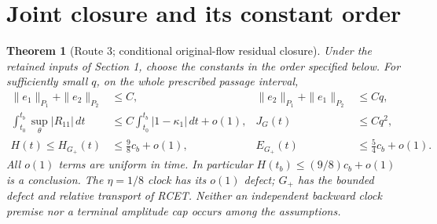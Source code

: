 \documentclass[11pt]{article}
\newtheorem{theorem}{Theorem}[section]
\theoremstyle{remark}\newtheorem{remark}[theorem]{Remark}
\newcommand{\dd}{\,d}
\newcommand{\Gp}{G_+}
\begin{document}
\section{Joint closure and its constant order}
\begin{theorem}[Route 3; conditional original-flow residual closure]
\label{an03lcrcv1:closure}
Under the retained inputs of Section 1, choose the constants in
the order specified below. For sufficiently small $q$, on the whole
prescribed passage interval,
\begin{align}
 \|e_1\|_{P_1}+\|e_2\|_{P_2}&\le C,
 &\|e_2\|_{P_1}+\|e_1\|_{P_2}&\le Cq,
 \label{an03lcrcv1:residualconclusion}\\
 \int_{t_0}^{t_b}\sup_\theta|R_{11}|\dd t
 &\le C\int_{t_0}^{t_b}|1-\kappa_1|\dd t+o(1),
 &J_G(t)&\le Cq^2,
 \label{an03lcrcv1:rconclusion}\\
 H(t)\le H_{\Gp}(t)&\le\frac98c_b+o(1),
 &E_{\Gp}(t)&\le\frac54c_b+o(1).
 \label{an03lcrcv1:amplitudeconclusion}
\end{align}
All $o(1)$ terms are uniform in time. In particular
$H(t_b)\le(9/8)c_b+o(1)$ is a conclusion. The $\eta=1/8$ clock
has its $o(1)$ defect; $\Gp$ has the bounded defect and relative
transport of RCET. Neither an independent backward clock premise
nor a terminal amplitude cap occurs among the assumptions.
\end{theorem}
\end{document}
